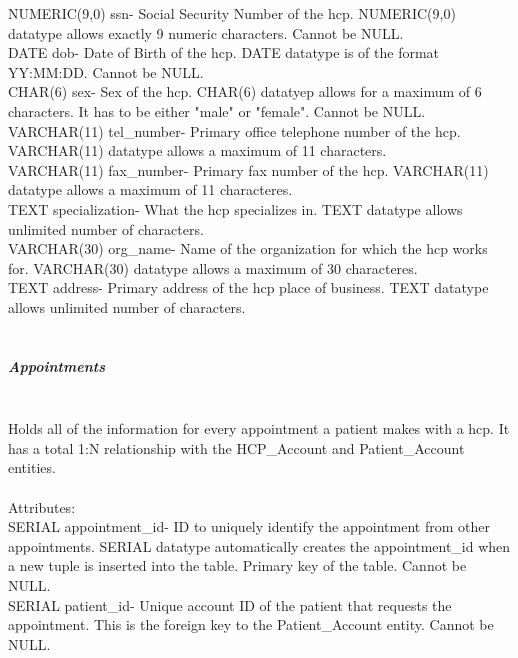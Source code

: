 \documentclass[12pt]{report}
\begin{document}
NUMERIC(9,0) ssn- Social Security Number of the hcp. NUMERIC(9,0) datatype allows exactly 9 numeric characters.  Cannot be NULL.\\

DATE dob- Date of Birth of the hcp.  DATE datatype is of the format YY:MM:DD.  Cannot be NULL.\\

CHAR(6) sex- Sex of the hcp. CHAR(6) datatyep allows for a maximum of 6 characters.  It has to be either "male" or "female".  Cannot be NULL.\\

VARCHAR(11) tel_number- Primary office telephone number of the hcp.  VARCHAR(11) datatype allows a maximum of 11 characters.\\

VARCHAR(11) fax_number- Primary fax number of the hcp.  VARCHAR(11) datatype allows a maximum of 11 characteres.\\

TEXT specialization- What the hcp specializes in.  TEXT datatype allows unlimited number of characters.\\

VARCHAR(30) org_name- Name of the organization for which the hcp works for.  VARCHAR(30) datatype allows a maximum of 30 characteres.\\

TEXT address- Primary address of the hcp place of business.  TEXT datatype allows unlimited number of characters.\\ \\

\subparagraph{Appointments}\\
Holds all of the information for every appointment a patient makes with a hcp.  It has a total 1:N relationship with the HCP_Account and Patient_Account entities.\\ \\

Attributes:\\
SERIAL appointment_id- ID to uniquely identify the appointment from other appointments. SERIAL datatype automatically creates the appointment_id when a new tuple is inserted into the table.  Primary key of the table.  Cannot be NULL.\\

SERIAL patient_id-  Unique account ID of the patient that requests the appointment.  This is the foreign key to the Patient_Account entity.  Cannot be NULL.\\
\end{document}
